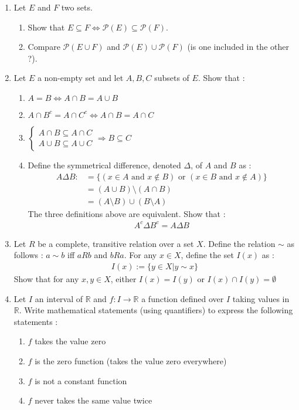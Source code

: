 \documentclass[11pt,letterpaper]{scrartcl}
\newcommand{\reals}{\mathbb{R}}
\newcommand{\Pcal}{\mathcal{P}}
\begin{document}
\begin{enumerate}
	\item Let $E$ and $F$ two sets. 
	\begin{enumerate}[label=\alph*.]
		\item Show that $E \subseteq F \Leftrightarrow \Pcal(E) \subseteq \Pcal(F)$.
		\item Compare $\Pcal(E \cup F)$ and $\Pcal(E) \cup \Pcal(F)$ (is one included in the other ?).
	\end{enumerate}

	\item Let $E$ a non-empty set and let $A,B,C$ subsets of $E$. Show that :
		\begin{enumerate}[label=\alph*.]
			\item $A = B \Leftrightarrow A \cap B = A \cup B$
			\item $A \cap B ^c = A \cap C^c \Leftrightarrow A \cap B = A \cap C$
			\item $\begin{cases}
			A \cap B \subseteq A \cap C 
			\\
			A \cup B \subseteq A \cup C
			\end{cases} 
			\Rightarrow
			B \subseteq C$
			\item Define the symmetrical difference, denoted $\Delta$, of $A$ and $B$ as :
			\begin{align*}
			A \Delta B :&= \{ (x \in A \text{ and } x \notin B) \text{ or }  (x \in B \text{ and } x \notin A) \}
			\\ & = (A \cup B) \setminus (A \cap B)
			\\ & = (A \setminus B) \cup (B \setminus A)
			\end{align*}
			The three definitions above are equivalent. Show that :
			\begin{align*}
			A^c \Delta B^c = A \Delta B
			\end{align*}
		\end{enumerate}

	\item Let $R$ be a complete, transitive relation over a set $X$. Define the relation $\sim$ as follows : $a \sim b$ iff $aRb$ and $bRa$. For any $x \in X$, define the set $I(x)$ as :
		\begin{align*}
			I(x) := \{ y \in X | y \sim x \}
		\end{align*}
	Show that for any $x,y \in X$, either $I(x)=I(y)$ or $I(x) \cap I(y)= \emptyset$
		

	\item Let $I$ an interval of $\reals$ and $f:I \rightarrow \reals$ a function defined over $I$ taking values in $\reals$. Write mathematical statements (using quantifiers) to express the following statements :
	\begin{enumerate}[label=\alph*.]
		\item $f$ takes the value zero
		\item $f$ is the zero function (takes the value zero everywhere)
		\item $f$ is not a constant function
		\item $f$ never takes the same value twice
	\end{enumerate}


\end{enumerate}
\end{document}
